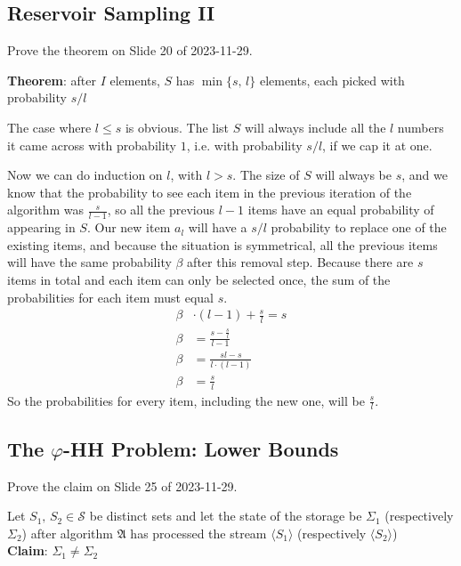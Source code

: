 \documentclass{article}
\let\phi\varphi
\begin{document}
  \subsection{Reservoir Sampling II}
  \begin{centerframebox}
    Prove the theorem on Slide 20 of 2023-11-29.

    \textbf{Theorem}: after $I$ elements, $S$ has $\min\{s,\, l\}$ elements, each picked with probability $s/l$
  \end{centerframebox}
  The case where $l \leq s$ is obvious. The list $S$ will always include all the $l$ numbers it came across with probability $1$, i.e. with probability $s/l$, if we cap it at one.

  Now we can do induction on $l$, with $l > s$. The size of $S$ will always be $s$, and we know that the probability to see each item in the previous iteration of the algorithm was $\frac{s}{l-1}$, so all the previous $l-1$ items have an equal probability of appearing in $S$.
  Our new item $a_l$ will have a $s/l$ probability to replace one of the existing items,
  and because the situation is symmetrical, all the previous items will have the same probability $\beta$ after this removal step.
  Because there are $s$ items in total and each item can only be selected once, the sum of the probabilities for each item must equal $s$.
  \begin{align*}
    \beta &\cdot (l-1) + \frac{s}{l} = s \\
    \beta &= \frac{s - \frac{s}{l}}{l-1} \\
    \beta &= \frac{sl - s}{l \cdot (l-1)} \\
    \beta &= \frac{s}{l}
  \end{align*}
  So the probabilities for every item, including the new one, will be $\frac{s}{l}$.


  \subsection{The $\phi$-HH Problem: Lower Bounds}
  \begin{centerframebox}
    Prove the claim on Slide 25 of 2023-11-29.

    Let $S_1,\, S_2 \in \mathcal{S}$ be distinct sets and let the state of the storage be $\Sigma_1$
    (respectively $\Sigma_2$) after algorithm $\mathfrak{A}$ has processed the stream $\langle S_1\rangle$
    (respectively $\langle S_2\rangle$) \\
    \textbf{Claim}: $\Sigma_1 \neq \Sigma_2$
  \end{centerframebox}
\end{document}
